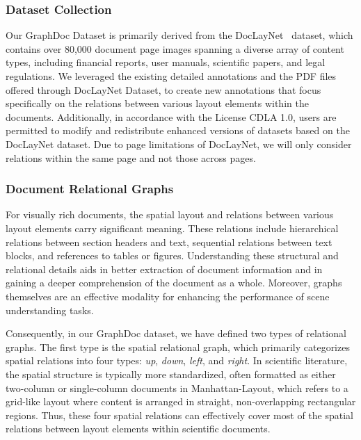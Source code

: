 \subsubsection{Dataset Collection}
Our GraphDoc Dataset is primarily derived from the DocLayNet~\citep{doclaynet2022} dataset, which contains over 80,000 document page images spanning a diverse array of content types, including financial reports, user manuals, scientific papers, and legal regulations. We leveraged the existing detailed annotations and the PDF files offered through DocLayNet Dataset, to create new annotations that focus specifically on the relations between various layout elements within the documents. Additionally, in accordance with the License CDLA 1.0, users are permitted to modify and redistribute enhanced versions of datasets based on the DocLayNet dataset. Due to page limitations of DocLayNet, we will only consider relations within the same page and not those across pages.

\subsubsection{Document Relational Graphs}
\label{sec:relationgraph}
For visually rich documents, the spatial layout and relations between various layout elements carry significant meaning. These relations include hierarchical relations between section headers and text, sequential relations between text blocks, and references to tables or figures. Understanding these structural and relational details aids in better extraction of document information and in gaining a deeper comprehension of the document as a whole. Moreover, graphs themselves are an effective modality for enhancing the performance of scene understanding tasks.

Consequently, in our GraphDoc dataset, we have defined two types of relational graphs. The first type is the spatial relational graph, which primarily categorizes spatial relations into four types: \textit{up}, \textit{down}, \textit{left}, and \textit{right}. In scientific literature, the spatial structure is typically more standardized, often formatted as either two-column or single-column documents in Manhattan-Layout, which refers to a grid-like layout where content is arranged in straight, non-overlapping rectangular regions. Thus, these four spatial relations can effectively cover most of the spatial relations between layout elements within scientific documents.

